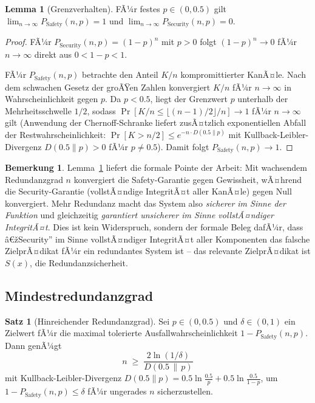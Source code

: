 ﻿\documentclass[a4paper,12pt]{article}
\theoremstyle{definition}
\newtheorem{satz}{Satz}
\newtheorem{lemma}{Lemma}
\newtheorem{bemerkung}{Bemerkung}
\begin{document}
\begin{lemma}[Grenzverhalten]
	\label{lem:grenzwert}
	FÃ¼r festes $p \in (0,0.5)$ gilt $\lim_{n\to\infty} P_{\mathrm{Safety}}(n,p) = 1$ und $\lim_{n\to\infty} P_{\mathrm{Security}}(n,p) = 0$.
\end{lemma}

\begin{proof}
	FÃ¼r $P_{\mathrm{Security}}(n,p) = (1-p)^n$ mit $p>0$ folgt $(1-p)^n \to 0$ fÃ¼r $n \to \infty$ direkt aus $0 < 1-p < 1$.

	FÃ¼r $P_{\mathrm{Safety}}(n,p)$ betrachte den Anteil $K/n$ kompromittierter KanÃ¤le. Nach dem schwachen Gesetz der groÃŸen Zahlen konvergiert $K/n$ fÃ¼r $n\to\infty$ in Wahrscheinlichkeit gegen $p$. Da $p < 0.5$, liegt der Grenzwert $p$ unterhalb der Mehrheitsschwelle $1/2$, sodass $\Pr[K/n \leq \lfloor (n-1)/2\rfloor/n] \to 1$ fÃ¼r $n \to \infty$ gilt (Anwendung der Chernoff-Schranke liefert zusÃ¤tzlich exponentiellen Abfall der Restwahrscheinlichkeit: $\Pr[K > n/2] \leq e^{-n \cdot D(0.5 \| p)}$ mit Kullback-Leibler-Divergenz $D(0.5\|p) > 0$ fÃ¼r $p \neq 0.5$). Damit folgt $P_{\mathrm{Safety}}(n,p) \to 1$. \qedhere
\end{proof}

\begin{bemerkung}
	Lemma~\ref{lem:grenzwert} liefert die formale Pointe der Arbeit: Mit wachsendem Redundanzgrad $n$ konvergiert die Safety-Garantie gegen Gewissheit, wÃ¤hrend die Security-Garantie (vollstÃ¤ndige IntegritÃ¤t aller KanÃ¤le) gegen Null konvergiert. Mehr Redundanz macht das System also \emph{sicherer im Sinne der Funktion} und gleichzeitig \emph{garantiert unsicherer im Sinne vollstÃ¤ndiger IntegritÃ¤t}. Dies ist kein Widerspruch, sondern der formale Beleg dafÃ¼r, dass â€žSecurity'' im Sinne vollstÃ¤ndiger IntegritÃ¤t aller Komponenten das falsche ZielprÃ¤dikat fÃ¼r ein redundantes System ist -- das relevante ZielprÃ¤dikat ist $S(x)$, die Redundanzsicherheit.
\end{bemerkung}

\subsection{Mindestredundanzgrad}

\begin{satz}[Hinreichender Redundanzgrad]
	\label{satz:minimalradundanz}
	Sei $p \in (0,0.5)$ und $\delta \in (0,1)$ ein Zielwert fÃ¼r die maximal tolerierte Ausfallwahrscheinlichkeit $1 - P_{\mathrm{Safety}}(n,p)$. Dann genÃ¼gt
	\[
	n \;\geq\; \frac{2\ln(1/\delta)}{D(0.5\,\|\,p)}
	\]
	mit Kullback-Leibler-Divergenz $D(0.5\|p) = 0.5\ln\frac{0.5}{p} + 0.5\ln\frac{0.5}{1-p}$, um $1 - P_{\mathrm{Safety}}(n,p) \leq \delta$ fÃ¼r ungerades $n$ sicherzustellen.
\end{satz}
\end{document}
